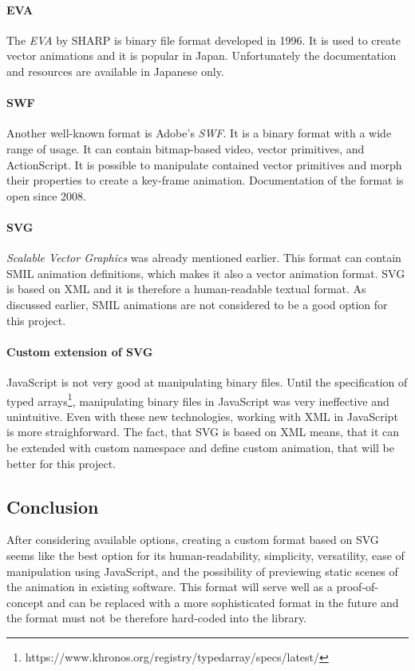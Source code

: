 \paragraph{EVA} The \textit{EVA} by SHARP\cite{eva_sharp} is binary file format developed in 1996. It is used to create vector animations and it is popular in Japan. Unfortunately the documentation and resources are available in Japanese only\cite{eva_wikipedia}.

\paragraph{SWF} Another well-known format is Adobe's \textit{SWF}. It is a binary format with a wide range of usage. It can contain bitmap-based video, vector primitives, and ActionScript\cite{swf_wiki}. It is possible to manipulate contained vector primitives and morph their properties to create a key-frame animation\cite{swf_doc}. Documentation of the format is open since 2008.

\paragraph{SVG} \textit{Scalable Vector Graphics} was already mentioned earlier. This format can contain SMIL animation definitions, which makes it also a vector animation format. SVG is based on XML and it is therefore a human-readable textual format. As discussed earlier, SMIL animations are not considered to be a good option for this project.

\paragraph{Custom extension of SVG} JavaScript is not very good at manipulating binary files. Until the specification of typed arrays\footnote{https://www.khronos.org/registry/typedarray/specs/latest/}, manipulating binary files in JavaScript was very ineffective and unintuitive. Even with these new technologies, working with XML in JavaScript is more straighforward. The fact, that SVG is based on XML means, that it can be extended with custom namespace and define custom animation, that will be better for this project.

\subsection{Conclusion}
After considering available options, creating a custom format based on SVG seems like the best option for its human-readability, simplicity, versatility, ease of manipulation using JavaScript, and the possibility of previewing static scenes of the animation in existing software. This format will serve well as a proof-of-concept and can be replaced with a more sophisticated format in the future and the format must not be therefore hard-coded into the library.

